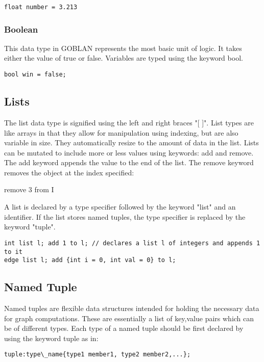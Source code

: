 \documentclass{article}
\begin{document}
\begin{lstlisting}
float number = 3.213
\end{lstlisting}

\subsubsection{Boolean}
This data type in GOBLAN represents the most basic unit of logic. It takes either the value of true or false. Variables are typed using the keyword bool.

\begin{lstlisting}
bool win = false;
\end{lstlisting}

\subsection{Lists} %
The list data type is signified using the left and right braces "[ ]". List types are like arrays in that they allow for manipulation using indexing, but are also variable in size. They automatically resize to the amount of data in the list. Lists can be mutated to include more or less values using keywords: add and remove. The add keyword appends the value to the end of the list. 
The remove keyword removes the object at the index specified: 

remove 3 from I

A list is declared by a type specifier followed by the keyword "list" and an identifier. If the list stores named tuples, the type specifier is replaced by the keyword "tuple". 

\begin{lstlisting}
int list l; add 1 to l; // declares a list l of integers and appends 1 to it
edge list l; add {int i = 0, int val = 0} to l; 
\end{lstlisting}

\subsection{Named Tuple} %
Named tuples are flexible data structures intended for holding the necessary data for graph computations. These are essentially a list of key,value pairs which can be of different types. Each type of a named tuple should be first declared by using the keyword tuple as in:

\begin{lstlisting}
tuple:type\_name{type1 member1, type2 member2,...};
\end{lstlisting}
\end{document}
